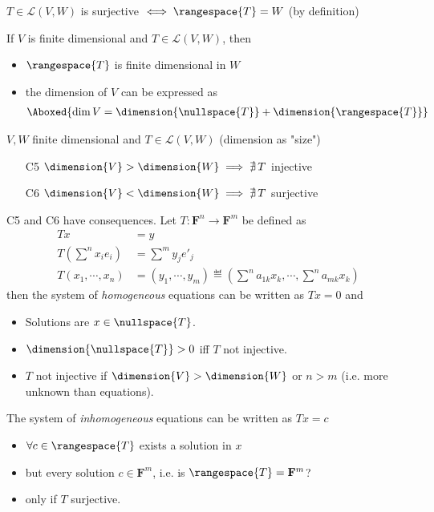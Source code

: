 \begin{description}
  \item[surjective] $T\in\mathcal{L}(V,W)$ is surjective $\iff  \rangespace{T} = W$ (by definition)
  \item[T4] If $V$ is finite dimensional and $T\in\mathcal{L}(V,W)$, then
  \begin{itemize}
  \item $\rangespace{T}$ is finite dimensional in $W$
  \item the dimension of $V$ can be expressed as
  \begin{align*}
  \Aboxed{\dim{V} = \dimension{\nullspace{T}} + \dimension{\rangespace{T}}}
  \end{align*}
  \end{itemize}
  \item $V,W$ finite dimensional and $T\in\mathcal{L}(V,W)$ (dimension as "size")
  \begin{itemize}
  \item[C5] $\dimension{V} > \dimension{W} \implies \nexists\,T$ injective
  \item[C6] $\dimension{V} < \dimension{W} \implies \nexists\,T$ surjective
  \end{itemize}
  \item [Theory of linear equations] C5 and C6 have consequences. Let $T:\mathbf{F}^n\to\mathbf{F}^m$ be defined as 
  \begin{align*}
  Tx &= y \\
  T(\sum^n x_i e_i) &= \sum^m y_j e'_j \\
  T(x_1,\cdots,x_n) &= (y_1,\cdots,y_m) \eqdef (\sum^n a_{1k}x_k, \cdots,\sum^n a_{mk}x_k)
  \end{align*}
  then the system of \emph{homogeneous} equations can be written as $Tx=0$ and
  \begin{itemize}
  \item Solutions are $x\in\nullspace{T}$.
  \item $\dimension{\nullspace{T}}>0$ iff $T$ not injective.
  \item  $T$ not injective if $\dimension{V} > \dimension{W}$ or $n>m$ (i.e. more unknown than equations).
  \end{itemize}
  The system of \emph{inhomogeneous} equations can be written as $Tx=c$
  \begin{itemize}
  \item $\forall c\in\rangespace{T}$ exists a solution in $x$
  \item but every solution $c\in \mathbf{F}^m$, i.e. is $\rangespace{T}=\mathbf{F}^m$?
  \item only if $T$ surjective.

\end{itemize}
\end{description}
